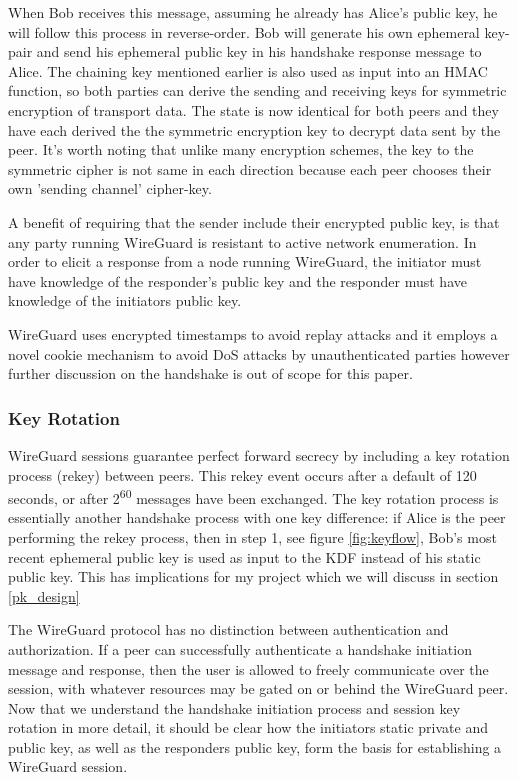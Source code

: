 \documentclass [11pt, proquest] {uwthesis}[2020/02/24]
\begin{document}
When Bob receives this message, assuming he already has Alice's public key, he will follow this process in reverse-order. Bob will generate his own ephemeral key-pair and send his ephemeral public key in his handshake response message to Alice. The chaining key mentioned earlier is also used as input into an HMAC function, so both parties can derive the sending and receiving keys for symmetric encryption of transport data.
The state is now identical for both peers and they have each derived the the symmetric encryption key to decrypt data sent by the peer. It's worth noting that unlike many encryption schemes, the key to the symmetric cipher is not same in each direction because each peer chooses their own 'sending channel' cipher-key.

A benefit of requiring that the sender include their encrypted public key, is that any party running WireGuard is resistant to active network enumeration. In order to elicit a response from a node running WireGuard, the initiator must have knowledge of the responder's public key and the responder must have knowledge of the initiators public key.

WireGuard uses encrypted timestamps to avoid replay attacks and it employs a novel cookie mechanism to avoid DoS attacks by unauthenticated parties however further discussion on the handshake is out of scope for this paper.

\subsubsection{Key Rotation}
\label{keyrotate}
WireGuard sessions guarantee perfect forward secrecy by including a key rotation process (rekey) between peers. This rekey event occurs after a default of 120 seconds, or after 2\textsuperscript{60} messages have been exchanged. The key rotation process is essentially another handshake process with one key difference: if Alice is the peer performing the rekey process, then in step 1, see figure \ref{fig:keyflow}, Bob's most recent ephemeral public key is used as input to the KDF instead of his static public key. This has implications for my project which we will discuss in section \ref{pk_design}

The WireGuard protocol has no distinction between authentication and authorization. If a peer can successfully authenticate a handshake initiation message and response, then the user is allowed to freely communicate over the session, with whatever resources may be gated on or behind the WireGuard peer.
Now that we understand the handshake initiation process and session key rotation in more detail, it should be clear how the initiators static private and public key, as well as the responders public key, form the basis for establishing a WireGuard session.
\end{document}
